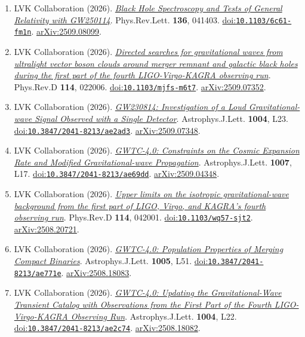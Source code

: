 \documentclass[11pt]{article}
\begin{document}
\begin{enumerate}
\item LVK Collaboration (2026). \href{https://arxiv.org/abs/2509.08099}{\textit{Black Hole Spectroscopy and Tests of General Relativity with GW250114}}. Phys.Rev.Lett. \textbf{136}, 041403. \href{https://doi.org/10.1103/6c61-fm1n}{doi:\nolinkurl{10.1103/6c61-fm1n}}. \href{https://arxiv.org/abs/2509.08099}{arXiv:2509.08099}.
\item LVK Collaboration (2026). \href{https://arxiv.org/abs/2509.07352}{\textit{Directed searches for gravitational waves from ultralight vector boson clouds around merger remnant and galactic black holes during the first part of the fourth LIGO-Virgo-KAGRA observing run}}. Phys.Rev.D \textbf{114}, 022006. \href{https://doi.org/10.1103/mjfs-m6t7}{doi:\nolinkurl{10.1103/mjfs-m6t7}}. \href{https://arxiv.org/abs/2509.07352}{arXiv:2509.07352}.
\item LVK Collaboration (2026). \href{https://arxiv.org/abs/2509.07348}{\textit{GW230814: Investigation of a Loud Gravitational-wave Signal Observed with a Single Detector}}. Astrophys.J.Lett. \textbf{1004}, L23. \href{https://doi.org/10.3847/2041-8213/ae2ad3}{doi:\nolinkurl{10.3847/2041-8213/ae2ad3}}. \href{https://arxiv.org/abs/2509.07348}{arXiv:2509.07348}.
\item LVK Collaboration (2026). \href{https://arxiv.org/abs/2509.04348}{\textit{GWTC-4.0: Constraints on the Cosmic Expansion Rate and Modified Gravitational-wave Propagation}}. Astrophys.J.Lett. \textbf{1007}, L17. \href{https://doi.org/10.3847/2041-8213/ae69dd}{doi:\nolinkurl{10.3847/2041-8213/ae69dd}}. \href{https://arxiv.org/abs/2509.04348}{arXiv:2509.04348}.
\item LVK Collaboration (2026). \href{https://arxiv.org/abs/2508.20721}{\textit{Upper limits on the isotropic gravitational-wave background from the first part of LIGO, Virgo, and KAGRA's fourth observing run}}. Phys.Rev.D \textbf{114}, 042001. \href{https://doi.org/10.1103/wq57-sjt2}{doi:\nolinkurl{10.1103/wq57-sjt2}}. \href{https://arxiv.org/abs/2508.20721}{arXiv:2508.20721}.
\item LVK Collaboration (2026). \href{https://arxiv.org/abs/2508.18083}{\textit{GWTC-4.0: Population Properties of Merging Compact Binaries}}. Astrophys.J.Lett. \textbf{1005}, L51. \href{https://doi.org/10.3847/2041-8213/ae771e}{doi:\nolinkurl{10.3847/2041-8213/ae771e}}. \href{https://arxiv.org/abs/2508.18083}{arXiv:2508.18083}.
\item LVK Collaboration (2026). \href{https://arxiv.org/abs/2508.18082}{\textit{GWTC-4.0: Updating the Gravitational-Wave Transient Catalog with Observations from the First Part of the Fourth LIGO-Virgo-KAGRA Observing Run}}. Astrophys.J.Lett. \textbf{1004}, L22. \href{https://doi.org/10.3847/2041-8213/ae2c74}{doi:\nolinkurl{10.3847/2041-8213/ae2c74}}. \href{https://arxiv.org/abs/2508.18082}{arXiv:2508.18082}.

\end{enumerate}
\end{document}
